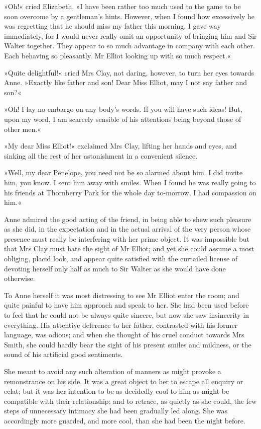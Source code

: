 »Oh!« cried Elizabeth, »I have been rather too much used to the game to be soon overcome by a gentleman's hints. However, when I found how excessively he was regretting that he should miss my father this morning, I gave way immediately, for I would never really omit an opportunity of bringing him and Sir Walter together. They appear to so much advantage in company with each other. Each behaving so pleasantly. Mr Elliot looking up with so much respect.«

»Quite delightful!« cried Mrs Clay, not daring, however, to turn her eyes towards Anne. »Exactly like father and son! Dear Miss Elliot, may I not say father and son?«

»Oh! I lay no embargo on any body's words. If you will have such ideas! But, upon my word, I am scarcely sensible of his attentions being beyond those of other men.«

»My dear Miss Elliot!« exclaimed Mrs Clay, lifting her hands and eyes, and sinking all the rest of her astonishment in a convenient silence.

»Well, my dear Penelope, you need not be so alarmed about him. I did invite him, you know. I sent him away with smiles. When I found he was really going to his friends at Thornberry Park for the whole day to-morrow, I had compassion on him.«

Anne admired the good acting of the friend, in being able to shew such pleasure as she did, in the expectation and in the actual arrival of the very person whose presence must really be interfering with her prime object. It was impossible but that Mrs Clay must hate the sight of Mr Elliot; and yet she could assume a most obliging, placid look, and appear quite satisfied with the curtailed license of devoting herself only half as much to Sir Walter as she would have done otherwise.

To Anne herself it was most distressing to see Mr Elliot enter the room; and quite painful to have him approach and speak to her. She had been used before to feel that he could not be always quite sincere, but now she saw insincerity in everything. His attentive deference to her father, contrasted with his former language, was odious; and when she thought of his cruel conduct towards Mrs Smith, she could hardly bear the sight of his present smiles and mildness, or the sound of his artificial good sentiments.

She meant to avoid any such alteration of manners as might provoke a remonstrance on his side. It was a great object to her to escape all enquiry or eclat; but it was her intention to be as decidedly cool to him as might be compatible with their relationship; and to retrace, as quietly as she could, the few steps of unnecessary intimacy she had been gradually led along. She was accordingly more guarded, and more cool, than she had been the night before.

